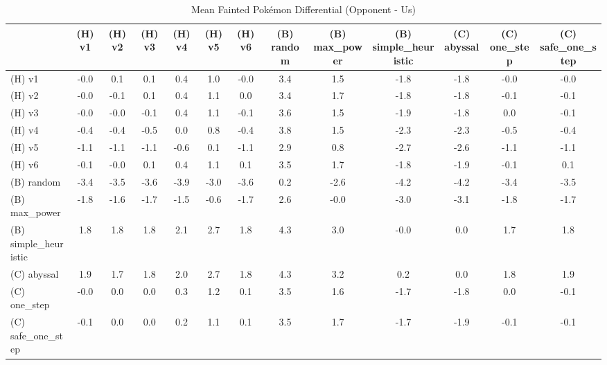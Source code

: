 \begin{table}[htbp]
\caption{Mean Fainted Pokémon Differential (Opponent - Us)}
\label{tab:fainted_diff}
\begin{tabular}{lcccccccccccc}
\hline
 & (H) v1 & (H) v2 & (H) v3 & (H) v4 & (H) v5 & (H) v6 & (B) random & (B) max\_power & (B) simple\_heuristic & (C) abyssal & (C) one\_step & (C) safe\_one\_step \\
\hline
(H) v1 & -0.0 & 0.1 & 0.1 & 0.4 & 1.0 & -0.0 & 3.4 & 1.5 & -1.8 & -1.8 & -0.0 & -0.0 \\
(H) v2 & -0.0 & -0.1 & 0.1 & 0.4 & 1.1 & 0.0 & 3.4 & 1.7 & -1.8 & -1.8 & -0.1 & -0.1 \\
(H) v3 & -0.0 & -0.0 & -0.1 & 0.4 & 1.1 & -0.1 & 3.6 & 1.5 & -1.9 & -1.8 & 0.0 & -0.1 \\
(H) v4 & -0.4 & -0.4 & -0.5 & 0.0 & 0.8 & -0.4 & 3.8 & 1.5 & -2.3 & -2.3 & -0.5 & -0.4 \\
(H) v5 & -1.1 & -1.1 & -1.1 & -0.6 & 0.1 & -1.1 & 2.9 & 0.8 & -2.7 & -2.6 & -1.1 & -1.1 \\
(H) v6 & -0.1 & -0.0 & 0.1 & 0.4 & 1.1 & 0.1 & 3.5 & 1.7 & -1.8 & -1.9 & -0.1 & 0.1 \\
(B) random & -3.4 & -3.5 & -3.6 & -3.9 & -3.0 & -3.6 & 0.2 & -2.6 & -4.2 & -4.2 & -3.4 & -3.5 \\
(B) max\_power & -1.8 & -1.6 & -1.7 & -1.5 & -0.6 & -1.7 & 2.6 & -0.0 & -3.0 & -3.1 & -1.8 & -1.7 \\
(B) simple\_heuristic & 1.8 & 1.8 & 1.8 & 2.1 & 2.7 & 1.8 & 4.3 & 3.0 & -0.0 & 0.0 & 1.7 & 1.8 \\
(C) abyssal & 1.9 & 1.7 & 1.8 & 2.0 & 2.7 & 1.8 & 4.3 & 3.2 & 0.2 & 0.0 & 1.8 & 1.9 \\
(C) one\_step & -0.0 & 0.0 & 0.0 & 0.3 & 1.2 & 0.1 & 3.5 & 1.6 & -1.7 & -1.8 & 0.0 & -0.1 \\
(C) safe\_one\_step & -0.1 & 0.0 & 0.0 & 0.2 & 1.1 & 0.1 & 3.5 & 1.7 & -1.7 & -1.9 & -0.1 & -0.1 \\
\hline
\end{tabular}
\end{table}
